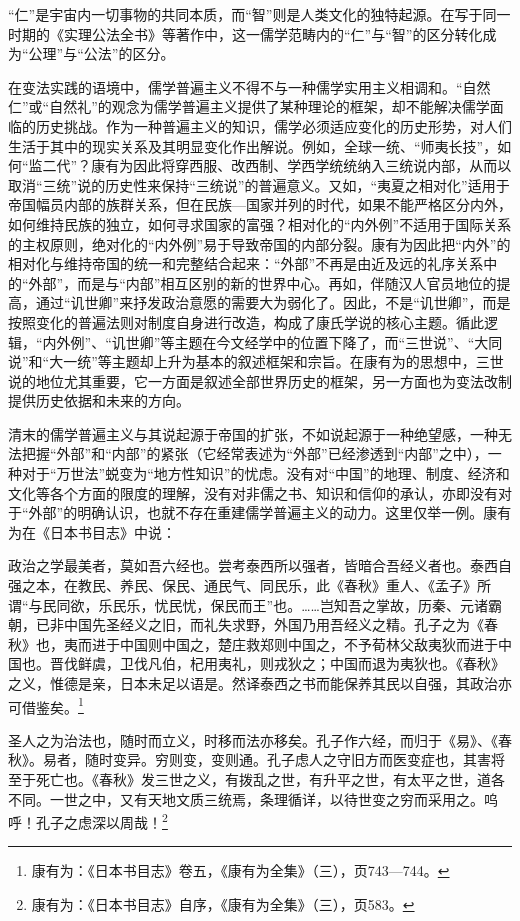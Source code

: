 \documentclass[a4paper, 12pt, openright]{ctexbook}
\renewenvironment{quote}
  {\list{}{\rightmargin2\ccwd \leftmargin2\ccwd \itemindent=2\ccwd \listparindent=2\ccwd}%
   \item\relax\small\kaishu\color{black}}
  {\endlist}
\begin{document}
“仁”是宇宙内一切事物的共同本质，而“智”则是人类文化的独特起源。在写于同一时期的《实理公法全书》等著作中，这一儒学范畴内的“仁”与“智”的区分转化成为“公理”与“公法”的区分。

在变法实践的语境中，儒学普遍主义不得不与一种儒学实用主义相调和。“自然仁”或“自然礼”的观念为儒学普遍主义提供了某种理论的框架，却不能解决儒学面临的历史挑战。作为一种普遍主义的知识，儒学必须适应变化的历史形势，对人们生活于其中的现实关系及其明显变化作出解说。例如，全球一统、“师夷长技”，如何“监二代”？康有为因此将穿西服、改西制、学西学统统纳入三统说内部，从而以取消“三统”说的历史性来保持“三统说”的普遍意义。又如，“夷夏之相对化”适用于帝国幅员内部的族群关系，但在民族—国家并列的时代，如果不能严格区分内外，如何维持民族的独立，如何寻求国家的富强？相对化的“内外例”不适用于国际关系的主权原则，绝对化的“内外例”易于导致帝国的内部分裂。康有为因此把“内外”的相对化与维持帝国的统一和完整结合起来：“外部”不再是由近及远的礼序关系中的“外部”，而是与“内部”相互区别的新的世界中心。再如，伴随汉人官员地位的提高，通过“讥世卿”来抒发政治意愿的需要大为弱化了。因此，不是“讥世卿”，而是按照变化的普遍法则对制度自身进行改造，构成了康氏学说的核心主题。循此逻辑，“内外例”、“讥世卿”等主题在今文经学中的位置下降了，而“三世说”、“大同说”和“大一统”等主题却上升为基本的叙述框架和宗旨。在康有为的思想中，三世说的地位尤其重要，它一方面是叙述全部世界历史的框架，另一方面也为变法改制提供历史依据和未来的方向。

清末的儒学普遍主义与其说起源于帝国的扩张，不如说起源于一种绝望感，一种无法把握“外部”和“内部”的紧张（它经常表述为“外部”已经渗透到“内部”之中），一种对于“万世法”蜕变为“地方性知识”的忧虑。没有对“中国”的地理、制度、经济和文化等各个方面的限度的理解，没有对非儒之书、知识和信仰的承认，亦即没有对于“外部”的明确认识，也就不存在重建儒学普遍主义的动力。这里仅举一例。康有为在《日本书目志》中说：

\begin{quote}
政治之学最美者，莫如吾六经也。尝考泰西所以强者，皆暗合吾经义者也。泰西自强之本，在教民、养民、保民、通民气、同民乐，此《春秋》重人、《孟子》所谓“与民同欲，乐民乐，忧民忧，保民而王”也。……岂知吾之掌故，历秦、元诸霸朝，已非中国先圣经义之旧，而礼失求野，外国乃用吾经义之精。孔子之为《春秋》也，夷而进于中国则中国之，楚庄救郑则中国之，不予荀林父敌夷狄而进于中国也。晋伐鲜虞，卫伐凡伯，杞用夷礼，则戎狄之；中国而退为夷狄也。《春秋》之义，惟德是亲，日本未足以语是。然译泰西之书而能保养其民以自强，其政治亦可借鉴矣。\footnote{康有为：《日本书目志》卷五，《康有为全集》（三），页743—744。}

圣人之为治法也，随时而立义，时移而法亦移矣。孔子作六经，而归于《易》、《春秋》。易者，随时变异。穷则变，变则通。孔子虑人之守旧方而医变症也，其害将至于死亡也。《春秋》发三世之义，有拨乱之世，有升平之世，有太平之世，道各不同。一世之中，又有天地文质三统焉，条理循详，以待世变之穷而采用之。呜呼！孔子之虑深以周哉！\footnote{康有为：《日本书目志》自序，《康有为全集》（三），页583。}
\end{quote}
\end{document}
